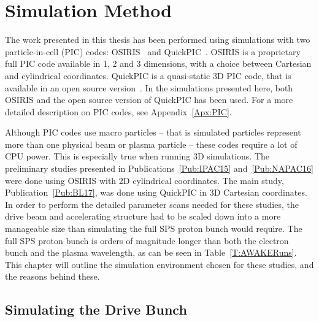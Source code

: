 %
%

\chapter{Simulation Method}
\label{Ch:SimS}

The work presented in this thesis has been performed using simulations with two particle-in-cell (PIC) codes:
OSIRIS~\cite{fonseca:2002} and QuickPIC~\cite{an:2013, huang:2006}.
OSIRIS is a proprietary full PIC code available in 1, 2 and 3 dimensions, with a choice between Cartesian and cylindrical coordinates.
QuickPIC is a quasi-static 3D PIC code, that is available in an open source version~\cite{add:quickpic:web}.
In the simulations presented here, both OSIRIS and the open source version of QuickPIC has been used.
For a more detailed description on PIC codes, see Appendix~\ref{Apx:PIC}.

Although PIC codes use macro particles -- that is simulated particles represent more than one physical beam or plasma particle -- these codes require a lot of CPU power.
This is especially true when running 3D simulations.
The preliminary studies presented in Publications~\ref{Pub:IPAC15} and~\ref{Pub:NAPAC16} were done using OSIRIS with 2D cylindrical coordinates.
The main study, Publication~\ref{Pub:BL17}, was done using QuickPIC in 3D Cartesian coordinates.
In order to perform the detailed parameter scans needed for these studies, the drive beam and accelerating structure had to be scaled down into a more manageable size than simulating the full SPS proton bunch would require.
The full SPS proton bunch is orders of magnitude longer than both the electron bunch and the plasma wavelength, as can be seen in Table~\ref{T:AWAKERuns}.
This chapter will outline the simulation environment chosen for these studies, and the reasons behind these.

\section{Simulating the Drive Bunch}
\label{Sim:PBeam}

